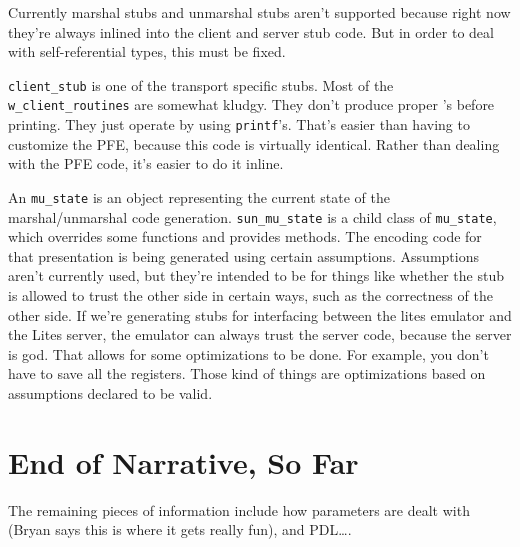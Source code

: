 Currently marshal stubs and unmarshal stubs aren't supported because right now
they're always inlined into the client and server stub code.  But in order to
deal with self-referential types, this must be fixed.

\texttt{client\_stub} is one of the transport specific stubs.  Most of the
\texttt{w\_client\_routines} are somewhat kludgy.  They don't produce proper
\CAST{}'s before printing.  They just operate by using \texttt{printf}'s.  That's
easier than having to customize the PFE, because this code is virtually
identical.  Rather than dealing with the PFE code, it's easier to do it inline.

An \texttt{mu\_state} is an object representing the current state of the
marshal/unmarshal code generation.  \texttt{sun\_mu\_state} is a child class of
\texttt{mu\_state}, which overrides some functions and provides methods.  The
encoding code for that presentation is being generated using certain
assumptions.  Assumptions aren't currently used, but they're intended to be for
things like whether the stub is allowed to trust the other side in certain
ways, such as the correctness of the other side.  If we're generating stubs for
interfacing between the lites emulator and the Lites server, the emulator can
always trust the server code, because the server is god.  That allows for some
optimizations to be done.  For example, you don't have to save all the
registers.  Those kind of things are optimizations based on assumptions
declared to be valid.


\section{End of Narrative, So Far}

The remaining pieces of information include how parameters are dealt with
(Bryan says this is where it gets really fun), and PDL\ldots{}.



